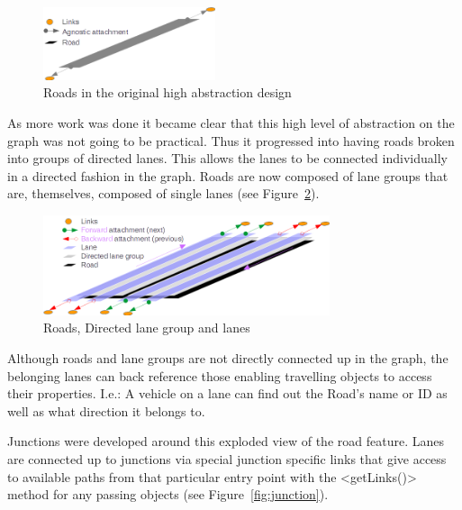 \begin{figure}[h]
    \vspace{1.5em}
    \caption{Roads in the original high abstraction design}
    \label{fig:RoadsOriginal}
    \centering
    \includegraphics[width=0.45\textwidth]{figs/graphConstruction/OriginalRoads.png}
    \vspace{1.5em}
\end{figure}

As more work was done it became clear that this high level of abstraction on the graph was not going to be practical. Thus it progressed into having roads broken into groups of directed lanes. This allows the lanes to be connected individually in a directed fashion in the graph. Roads are now composed of lane groups that are, themselves, composed of single lanes (see Figure~\ref{fig:RoadsFinal}).

\begin{figure}[h]
	\vspace{1.5em}
  	\caption{Roads, Directed lane group and lanes}
  	\label{fig:RoadsFinal}
  	\centering
	\includegraphics[width=0.75\textwidth]{figs/graphConstruction/Roads.png}
  	\vspace{1.5em}
\end{figure}	

Although roads and lane groups are not directly connected up in the graph, the belonging lanes can back reference those enabling travelling objects to access their properties. I.e.: A vehicle on a lane can find out the Road's name or ID as well as what direction it belongs to.

Junctions were developed around this exploded view of the road feature. Lanes are connected up to junctions via special junction specific links that give access to available paths from that particular entry point with the <getLinks()> method for any passing objects (see Figure~\ref{fig:junction}).

